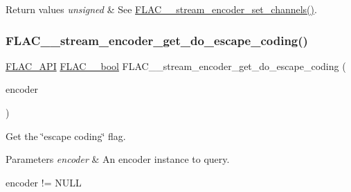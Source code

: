 \begin{DoxyRetVals}{Return values}
{\em unsigned} & See \hyperlink{group__flac__stream__encoder_gabfc9c883c124a849b5b42a87c30e10a5}{F\+L\+A\+C\+\_\+\+\_\+stream\+\_\+encoder\+\_\+set\+\_\+channels()}. \\
\hline
\end{DoxyRetVals}
\mbox{\label{group__flac__stream__encoder_ga06a8e154139880a2def5f54b6c2700d6}} 
\subsubsection{\texorpdfstring{F\+L\+A\+C\+\_\+\+\_\+stream\+\_\+encoder\+\_\+get\+\_\+do\+\_\+escape\+\_\+coding()}{FLAC\_\_stream\_encoder\_get\_do\_escape\_coding()}}
{\footnotesize\ttfamily \hyperlink{group__flac__export_ga56ca07df8a23310707732b1c0007d6f5}{F\+L\+A\+C\+\_\+\+A\+PI} \hyperlink{ordinals_8h_a95103469f1cbd78b8cf250194985b34e}{F\+L\+A\+C\+\_\+\+\_\+bool} F\+L\+A\+C\+\_\+\+\_\+stream\+\_\+encoder\+\_\+get\+\_\+do\+\_\+escape\+\_\+coding (\begin{DoxyParamCaption}\item[{\hyperlink{zconf_8h_a2c212835823e3c54a8ab6d95c652660e}{const} \hyperlink{struct_f_l_a_c_____stream_encoder}{F\+L\+A\+C\+\_\+\+\_\+\+Stream\+Encoder} $\ast$}]{encoder }\end{DoxyParamCaption})}

Get the \char`\"{}escape coding\char`\"{} flag.


\begin{DoxyParams}{Parameters}
{\em encoder} & An encoder instance to query.  
\begin{DoxyCode}
encoder != NULL 
\end{DoxyCode}
 \\
\hline
\end{DoxyParams}


